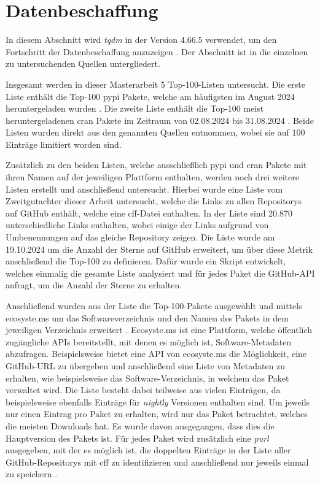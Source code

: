 \section{Datenbeschaffung}
\label{sec:datenbeschaffung}
In diesem Abschnitt wird \emph{tqdm} in der Version 4.66.5 verwendet, um den Fortschritt der Datenbeschaffung anzuzeigen \autocite{costa-luis_tqdm_2024}.
Der Abschnitt ist in die einzelnen zu untersuchenden Quellen untergliedert.

Insgesamt werden in dieser Masterarbeit 5 Top-100-Listen untersucht.
Die erste Liste enthält die Top-100 \gls{pypi} Pakete, welche am häufigsten im August 2024 heruntergeladen wurden \autocite{kemenade_top-pypi-packages_2024}.
Die zweite Liste enthält die Top-100 meist heruntergeladenen \gls{cran} Pakete im Zeitraum von 02.08.2024 bis 31.08.2024 \autocite{csardi_cranlogsapp_2024}.
Beide Listen wurden direkt aus den genannten Quellen entnommen, wobei sie auf 100 Einträge limitiert worden sind.

Zusätzlich zu den beiden Listen, welche ausschließlich \gls{pypi} und \gls{cran} Pakete mit ihren Namen auf der jeweiligen Plattform enthalten, werden noch drei weitere Listen erstellt und anschließend untersucht.
Hierbei wurde eine Liste vom Zweitgutachter dieser Arbeit untersucht, welche die Links zu allen Repositorys auf GitHub enthält, welche eine \gls{cff}-Datei enthalten.
In der Liste sind 20.870 unterschiedliche Links enthalten, wobei einige der Links aufgrund von Umbenennungen auf das gleiche Repository zeigen.
Die Liste wurde am 19.10.2024 um die Anzahl der Sterne auf GitHub erweitert, um über diese Metrik anschließend die Top-100 zu definieren.
Dafür wurde ein Skript entwickelt, welches einmalig die gesamte Liste analysiert und für jedes Paket die GitHub-API anfragt, um die Anzahl der Sterne zu erhalten.

Anschließend wurden aus der Liste die Top-100-Pakete ausgewählt und mittels ecosyste.ms um das Softwareverzeichnis und den Namen des Pakets in dem jeweiligen Verzeichnis erweitert \autocite{nesbitt_ecosystems_2024}.
Ecosyste.ms ist eine Plattform, welche öffentlich zugängliche APIs bereitstellt, mit denen es möglich ist, Software-Metadaten abzufragen.
Beispielsweise bietet eine API von ecosyste.ms die Möglichkeit, eine GitHub-URL zu übergeben und anschließend eine Liste von Metadaten zu erhalten, wie beispielsweise das Software-Verzeichnis, in welchem das Paket verwaltet wird.
Die Liste besteht dabei teilweise aus vielen Einträgen, da beispielsweise ebenfalls Einträge für \emph{nightly} Versionen enthalten sind.
Um jeweils nur einen Eintrag pro Paket zu erhalten, wird nur das Paket betrachtet, welches die meisten Downloads hat.
Es wurde davon ausgegangen, dass dies die Hauptversion des Pakets ist.
Für jedes Paket wird zusätzlich eine \emph{purl} ausgegeben, mit der es möglich ist, die doppelten Einträge in der Liste aller GitHub-Repositorys mit \gls{cff} zu identifizieren und anschließend nur jeweils einmal zu speichern \autocites{ombredanne_purl-spec_2024}{nesbitt_ecosystems_2024}.

